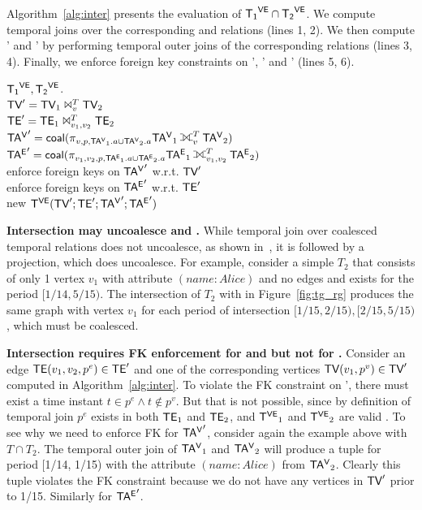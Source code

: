 Algorithm~\ref{alg:inter} presents the evaluation of $\mathsf{{T_1}^{VE}} \cap
\mathsf{{T_2}^{VE}}$.  We compute temporal joins over the corresponding \tv and \te
relations (lines 1, 2).  We then compute \tav' and \tae' by performing
temporal outer joins of the corresponding relations (lines 3, 4).
Finally, we enforce foreign key constraints on \te', \tav' and \tae'
(lines 5, 6).

\begin{algorithm}
\caption{Temporal graph intersection in \tve.}
\begin{algorithmic}[1]
\REQUIRE $\mathsf{{T_1}^{VE}}, \mathsf{{T_2}^{VE}}$.\\
\STATE $\textsf{TV}' = \textsf{TV}_1 \Join^T_v \textsf{TV}_2$\\
\STATE $\textsf{TE}' = \textsf{TE}_1 \Join^T_{v_1,v_2} \textsf{TE}_2$\\
\STATE $\tav' = \cl (\pi_{v,p,\tav_1.a \cup \tav_2.a}\tav_1 \fullouterjoin^T_v \tav_2)$\\
\STATE $\tae' = \cl (\pi_{v_1,v_2,p,\tae_1.a \cup \tae_2.a}\tae_1 \fullouterjoin^T_{v_1,v_2} \tae_2)$\\
\STATE  enforce foreign keys on $\mathsf{TA^{V}}'$ w.r.t. $\textsf{TV}'$\\
\STATE  enforce foreign keys on $\mathsf{TA^{E}}'$ w.r.t. $\textsf{TE}'$\\
\RETURN new $\mathsf{T^{VE}} (\textsf{TV}';\textsf{TE}';\mathsf{TA^{V}}';\mathsf{TA^{E}}')$\\
\end{algorithmic}
\label{alg:inter}
\end{algorithm}

{\bf Intersection may uncoalesce \tve and \trg.}  While temporal join over
coalesced temporal relations does not uncoalesce, as shown
in~\cite{DBLP:conf/vldb/BohlenSS96}, it is followed by a projection,
which does uncoalesce.  For example, consider a simple \tg $T_2$
that consists of only 1 vertex $v_1$ with attribute $(name:Alice)$ and
no edges and exists for the period $[1/14, 5/15)$.  The
  intersection of $T_2$ with  in Figure~\ref{fig:tg_rg}
  produces the same graph with vertex $v_1$ for each period of
  intersection $[1/15, 2/15), [2/15, 5/15)$, which must be coalesced.

{\bf Intersection requires FK enforcement for \tav and \tae but not
  for \te.}   Consider an edge $\textsf{TE}(v_1, v_2, p^e) \in \textsf{TE}'$ and
one of the corresponding vertices $\textsf{TV}(v_1, p^v) \in \textsf{TV}'$ computed in
Algorithm~\ref{alg:inter}.  To violate the FK constraint on \te',
there must exist a time instant $t \in p^e \wedge t \not\in p^v$.  But
that is not possible, since by definition of temporal join $p^e$
exists in both $\textsf{TE}_1$ and $\textsf{TE}_2$, and $\mathsf{T^{VE}}_1$ and $\mathsf{T^{VE}}_2$ are
valid \tgs.  To see why we need to enforce FK for $\mathsf{TA^{V}}'$, consider
again the example above with $T \cap T_2$.  The temporal outer join of
$\mathsf{TA^{V}}_1$ and $\mathsf{TA^{V}}_2$ will produce a tuple for period [1/14, 1/15)
  with the attribute $(name:Alice)$ from $\mathsf{TA^{V}}_2$.  Clearly this tuple
  violates the FK constraint because we do not have any vertices in
  $\textsf{TV}'$ prior to 1/15.  Similarly for $\mathsf{TA^{E}}'$.

